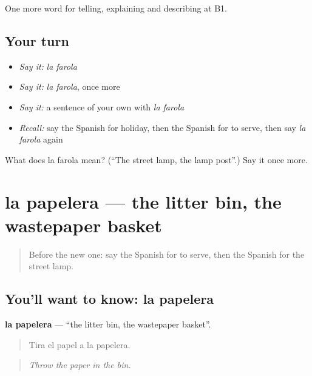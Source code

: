 \begin{grammarlens}[title={What you've built}]
One more word for telling, explaining and describing at B1.
\end{grammarlens}

\subsection*{Your turn}
\begin{itemize}
\raggedright
  \item \emph{Say it:} \emph{la farola}
  \item \emph{Say it:} \emph{la farola}, once more
  \item \emph{Say it:} a sentence of your own with \emph{la farola}
  \item \emph{Recall:} say the Spanish for holiday, then the Spanish for to serve, then say \emph{la farola} again
\end{itemize}

\begin{tcolorbox}[breakable,colback=teal!4,colframe=teal!35!black,title={Before you move on}]
What does la farola mean? (\textquotedblleft{}The street lamp, the lamp post\textquotedblright{}.) Say it once more.
\end{tcolorbox}
\section[la papelera]{la papelera — the litter bin, the wastepaper basket}

\label{lesson:ES-C682-papelera}



\begin{quote}
Before the new one: say the Spanish for to serve, then the Spanish for the street lamp.
\end{quote}

\subsection*{You'll want to know: la papelera}
\textbf{la papelera} — \textquotedblleft{}the litter bin, the wastepaper basket\textquotedblright{}.

\begin{quote}
Tira el papel a la papelera.
\end{quote}

\begin{quote}
\emph{Throw the paper in the bin.}
\end{quote}

